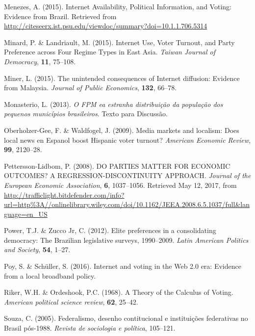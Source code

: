 \documentclass[
  12pt,
]{article}
\begin{document}
\leavevmode\hypertarget{ref-menezes_internet_2015}{}%
Menezes, A. (2015). Internet Availability, Political Information, and
Voting: Evidence from Brazil. Retrieved from
\url{http://citeseerx.ist.psu.edu/viewdoc/summary?doi=10.1.1.706.5314}

\leavevmode\hypertarget{ref-minard_internet_2015}{}%
Minard, P. \& Landriault, M. (2015). Internet Use, Voter Turnout, and
Party Preference across Four Regime Types in East Asia. \emph{Taiwan
Journal of Democracy}, \textbf{11}, 75--108.

\leavevmode\hypertarget{ref-miner_unintended_2015}{}%
Miner, L. (2015). The unintended consequences of Internet diffusion:
Evidence from Malaysia. \emph{Journal of Public Economics},
\textbf{132}, 66--78.

\leavevmode\hypertarget{ref-monasterio_o_2013}{}%
Monasterio, L. (2013). \emph{O FPM ea estranha distribuição da população
dos pequenos municípios brasileiros}. Texto para Discussão.

\leavevmode\hypertarget{ref-oberholzer-gee_media_2009}{}%
Oberholzer-Gee, F. \& Waldfogel, J. (2009). Media markets and localism:
Does local news en Espanol boost Hispanic voter turnout? \emph{American
Economic Review}, \textbf{99}, 2120--28.

\leavevmode\hypertarget{ref-pettersson-lidbom_parties_2008}{}%
Pettersson-Lidbom, P. (2008). DO PARTIES MATTER FOR ECONOMIC OUTCOMES? A
REGRESSION-DISCONTINUITY APPROACH. \emph{Journal of the European
Economic Association}, \textbf{6}, 1037--1056. Retrieved May 12, 2017,
from
\url{http://trafficlight.bitdefender.com/info?url=http\%3A//onlinelibrary.wiley.com/doi/10.1162/JEEA.2008.6.5.1037/full\&language=en_US}

\leavevmode\hypertarget{ref-power_elite_2012}{}%
Power, T.J. \& Zucco Jr, C. (2012). Elite preferences in a consolidating
democracy: The Brazilian legislative surveys, 1990--2009. \emph{Latin
American Politics and Society}, \textbf{54}, 1--27.

\leavevmode\hypertarget{ref-poy_internet_2016}{}%
Poy, S. \& Schüller, S. (2016). Internet and voting in the Web 2.0 era:
Evidence from a local broadband policy.

\leavevmode\hypertarget{ref-riker_theory_1968}{}%
Riker, W.H. \& Ordeshook, P.C. (1968). A Theory of the Calculus of
Voting. \emph{American political science review}, \textbf{62}, 25--42.

\leavevmode\hypertarget{ref-souza_federalismo_2005}{}%
Souza, C. (2005). Federalismo, desenho contitucional e instituições
federativas no Brasil pós-1988. \emph{Revista de sociologia e política},
105--121.
\end{document}
